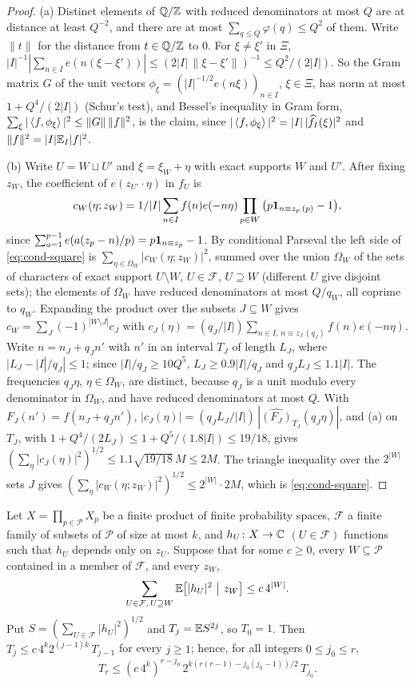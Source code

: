 \begin{proof}
(a) Distinct elements of $\mathbb Q/\mathbb Z$ with reduced denominators at most $Q$ are at
distance at least $Q^{-2}$, and there are at most $\sum_{q\le Q}\varphi(q)\le Q^2$
of them. Write $\|t\|$ for the distance from $t\in\mathbb Q/\mathbb Z$ to $0$.
For $\xi\ne\xi'$ in $\Xi$,
$|I|^{-1}|\sum_{n\in I}e(n(\xi-\xi'))|\le(2|I|\,\|\xi-\xi'\|)^{-1}
\le Q^2/(2|I|)$. So the Gram matrix $G$ of the unit vectors
$\phi_\xi=(|I|^{-1/2}e(n\xi))_{n\in I}$, $\xi\in\Xi$, has norm at most
$1+Q^4/(2|I|)$ (Schur's test), and Bessel's inequality in Gram form,
$\sum_\xi|\left\langle f,\phi_\xi\right\rangle|^2\le\|G\|\,\|f\|^2$, is the claim, since
$|\left\langle f,\phi_\xi\right\rangle|^2=|I|\,|\widehat f_I(\xi)|^2$ and $\|f\|^2=|I|\mathbb E_I|f|^2$.

(b) Write $U=W\sqcup U'$ and $\xi=\xi_W+\eta$ with exact supports $W$ and $U'$.
After fixing $z_W$, the coefficient of $e(z_{U'}\cdot\eta)$ in $f_U$ is
\[
 c_W(\eta;z_W)=1/|I|\sum_{n\in I}f(n)e(-n\eta)\prod_{p\in W}
 \big(p\mathbf 1_{n\equiv z_p\,(p)}-1\big),
\]
since $\sum_{a=1}^{p-1}e(a(z_p-n)/p)=p\mathbf 1_{n\equiv z_p}-1$. By conditional
Parseval the left side of \eqref{eq:cond-square} is
$\sum_{\eta\in\Omega_W}|c_W(\eta;z_W)|^2$, summed over the union $\Omega_W$ of the
sets of characters of exact support $U\setminus W$, $U\in\mathcal F$,
$U\supseteq W$ (different $U$ give disjoint sets); the elements of $\Omega_W$
have reduced denominators at most $Q/q_W$, all coprime to $q_W$. Expanding the
product over the subsets $J\subseteq W$ gives
$c_W=\sum_J(-1)^{|W\setminus J|}c_J$ with
$c_J(\eta)=(q_J/|I|)\sum_{n\in I,\,n\equiv z_J\,(q_J)}f(n)e(-n\eta)$. Write
$n=n_J+q_Jn'$ with $n'$ in an interval $T_J$ of length $L_J$, where
$|L_J-|I|/q_J|\le1$; since $|I|/q_J\ge10Q^5$, $L_J\ge0.9|I|/q_J$ and
$q_JL_J\le1.1|I|$. The frequencies $q_J\eta$, $\eta\in\Omega_W$, are distinct,
because $q_J$ is a unit modulo every denominator in $\Omega_W$, and have reduced
denominators at most $Q$. With $F_J(n')=f(n_J+q_Jn')$,
$|c_J(\eta)|=(q_JL_J/|I|)\,|\widehat{(F_J)}_{T_J}(q_J\eta)|$, and (a) on $T_J$, with
$1+Q^4/(2L_J)\le1+Q^5/(1.8|I|)\le19/18$, gives
$(\sum_\eta|c_J(\eta)|^2)^{1/2}\le1.1\sqrt{19/18}\,M\le2M$. The triangle inequality
over the $2^{|W|}$ sets $J$ gives
$(\sum_\eta|c_W(\eta;z_W)|^2)^{1/2}\le2^{|W|}\cdot2M$, which is
\eqref{eq:cond-square}.
\end{proof}

\begin{lemma}\label{lem:sqfun-rec}
Let $X=\prod_{p\in\mathcal P}X_p$ be a finite product of finite probability
spaces, $\mathcal F$ a finite family of subsets of $\mathcal P$ of size at most
$k$, and $h_U\colon X\to\mathbb C$ $(U\in\mathcal F)$ functions such that $h_U$
depends only on $z_U$. Suppose that for some $c\ge0$, every $W\subseteq\mathcal P$
contained in a member of $\mathcal F$, and every $z_W$,
\[
 \sum_{U\in\mathcal F,\,U\supseteq W}\mathbb E\big[|h_U|^2\ \big|\ z_W\big]\le c\,4^{|W|}.
\]
Put $S=(\sum_{U\in\mathcal F}|h_U|^2)^{1/2}$ and $T_j=\mathbb E S^{2j}$, so $T_0=1$.
Then $T_j\le c\,4^k2^{(j-1)k}\,T_{j-1}$ for every $j\ge1$; hence, for all
integers $0\le j_0\le r$,
\[
 T_r\le(c\,4^k)^{r-j_0}\,2^{k(r(r-1)-j_0(j_0-1))/2}\,T_{j_0}.
\]
\end{lemma}

